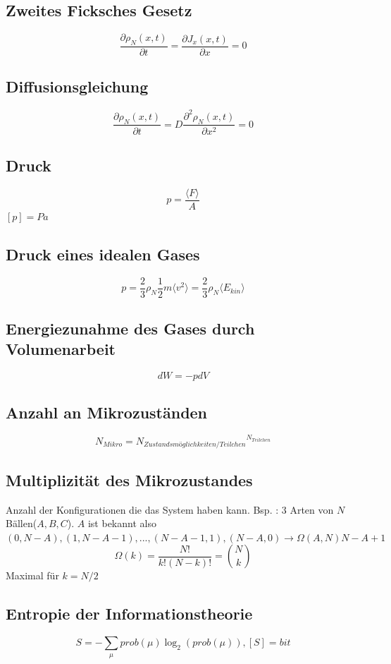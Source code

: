 \documentclass{article}
\begin{document}
\begin{multicols*}{3}
  \subsection{Zweites Ficksches Gesetz}

  $$\frac{\partial \rho _N(x,t)}{\partial t} = \frac{\partial J_x(x,t)}{\partial x} = 0$$

  \subsection{Diffusionsgleichung}
  $$\frac{\partial \rho _N(x,t)}{\partial t} = D\frac{\partial ^2 \rho _N(x,t)}{\partial x^2} = 0$$

  \subsection{Druck}

  $$p = \frac{\langle F \rangle}{A}$$
  $[p] = Pa$

  \subsection{Druck eines idealen Gases}
  $$p = \frac{2}{3}\rho _N\frac{1}{2}m\langle v^2\rangle= \frac{2}{3}\rho _N\langle E_{kin}\rangle$$

  \subsection{Energiezunahme des Gases durch Volumenarbeit}
  $$dW = -pdV$$

  \subsection{Anzahl an Mikrozuständen}
  $$N_{Mikro}={N_{Zustandsmöglichkeiten/Teilchen}}^{N_{Teilchen}}$$

  \subsection{Multiplizität des Mikrozustandes}
  Anzahl der Konfigurationen die das System haben kann.
  Bsp. : 3 Arten von $N$ Bällen($A,B,C$). $A$ ist bekannt also
  $(0, N - A), (1, N - A - 1), ..., (N - A - 1, 1), (N - A, 0)\rightarrow \Omega(A, N)  N - A + 1$
  $$\Omega(k)=\frac{N!}{k!(N-k)!}=\binom{N}{k}$$
  Maximal für $k=N/2$

  \subsection{Entropie der Informationstheorie}
  $$S=-\sum_{\mu}prob(\mu)\log_2(prob(\mu)), [S] = bit$$


\end{multicols*}
\end{document}
